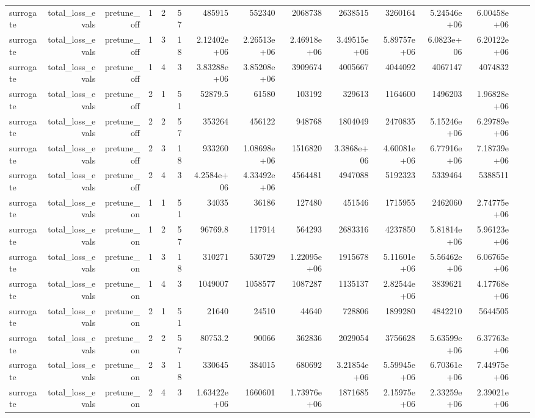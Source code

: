 \begin{table}[htbp]
\begin{tabular}{lrrrrrrrrrrrrrr}
surrogate & total\_loss\_evals & pretune\_off & 1 & 2 & 57 & 485915 & 552340 & 2068738 & 2638515 & 3260164 & 5.24546e+06 & 6.00458e+06 &  &  \\
surrogate & total\_loss\_evals & pretune\_off & 1 & 3 & 18 & 2.12402e+06 & 2.26513e+06 & 2.46918e+06 & 3.49515e+06 & 5.89757e+06 & 6.0823e+06 & 6.20122e+06 &  &  \\
surrogate & total\_loss\_evals & pretune\_off & 1 & 4 & 3 & 3.83288e+06 & 3.85208e+06 & 3909674 & 4005667 & 4044092 & 4067147 & 4074832 &  &  \\
surrogate & total\_loss\_evals & pretune\_off & 2 & 1 & 51 & 52879.5 & 61580 & 103192 & 329613 & 1164600 & 1496203 & 1.96828e+06 &  &  \\
surrogate & total\_loss\_evals & pretune\_off & 2 & 2 & 57 & 353264 & 456122 & 948768 & 1804049 & 2470835 & 5.15246e+06 & 6.29789e+06 &  &  \\
surrogate & total\_loss\_evals & pretune\_off & 2 & 3 & 18 & 933260 & 1.08698e+06 & 1516820 & 3.3868e+06 & 4.60081e+06 & 6.77916e+06 & 7.18739e+06 &  &  \\
surrogate & total\_loss\_evals & pretune\_off & 2 & 4 & 3 & 4.2584e+06 & 4.33492e+06 & 4564481 & 4947088 & 5192323 & 5339464 & 5388511 &  &  \\
surrogate & total\_loss\_evals & pretune\_on & 1 & 1 & 51 & 34035 & 36186 & 127480 & 451546 & 1715955 & 2462060 & 2.74775e+06 &  &  \\
surrogate & total\_loss\_evals & pretune\_on & 1 & 2 & 57 & 96769.8 & 117914 & 564293 & 2683316 & 4237850 & 5.81814e+06 & 5.96123e+06 &  &  \\
surrogate & total\_loss\_evals & pretune\_on & 1 & 3 & 18 & 310271 & 530729 & 1.22095e+06 & 1915678 & 5.11601e+06 & 5.56462e+06 & 6.06765e+06 &  &  \\
surrogate & total\_loss\_evals & pretune\_on & 1 & 4 & 3 & 1049007 & 1058577 & 1087287 & 1135137 & 2.82544e+06 & 3839621 & 4.17768e+06 &  &  \\
surrogate & total\_loss\_evals & pretune\_on & 2 & 1 & 51 & 21640 & 24510 & 44640 & 728806 & 1899280 & 4842210 & 5644505 &  &  \\
surrogate & total\_loss\_evals & pretune\_on & 2 & 2 & 57 & 80753.2 & 90066 & 362836 & 2029054 & 3756628 & 5.63599e+06 & 6.37763e+06 &  &  \\
surrogate & total\_loss\_evals & pretune\_on & 2 & 3 & 18 & 330645 & 384015 & 680692 & 3.21854e+06 & 5.59945e+06 & 6.70361e+06 & 7.44975e+06 &  &  \\
surrogate & total\_loss\_evals & pretune\_on & 2 & 4 & 3 & 1.63422e+06 & 1660601 & 1.73976e+06 & 1871685 & 2.15975e+06 & 2.33259e+06 & 2.39021e+06 &  &  \\

\end{tabular}
\end{table}
